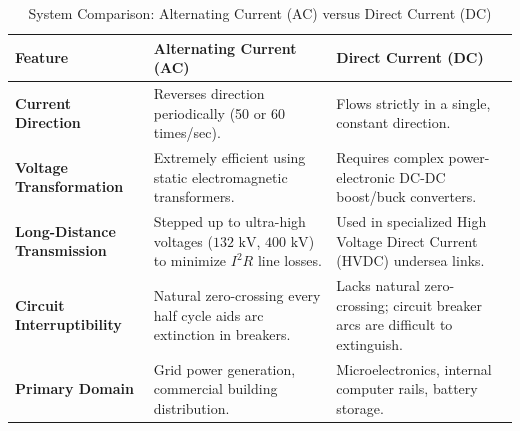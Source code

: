 \begin{table}[htbp]
\centering
\small
\caption{System Comparison: Alternating Current (AC) versus Direct Current (DC)}
\label{tab:ac_vs_dc}
\begin{tabularx}{\textwidth}{l X X}
\toprule
\textbf{Feature} & \textbf{Alternating Current (AC)} & \textbf{Direct Current (DC)} \\
\midrule
\textbf{Current Direction} & Reverses direction periodically (50 or 60 times/sec). & Flows strictly in a single, constant direction. \\
\textbf{Voltage Transformation} & Extremely efficient using static electromagnetic transformers. & Requires complex power-electronic DC-DC boost/buck converters. \\
\textbf{Long-Distance Transmission} & Stepped up to ultra-high voltages ($132\text{ kV}$, $400\text{ kV}$) to minimize $I^2R$ line losses. & Used in specialized High Voltage Direct Current (HVDC) undersea links. \\
\textbf{Circuit Interruptibility} & Natural zero-crossing every half cycle aids arc extinction in breakers. & Lacks natural zero-crossing; circuit breaker arcs are difficult to extinguish. \\
\textbf{Primary Domain} & Grid power generation, commercial building distribution. & Microelectronics, internal computer rails, battery storage. \\
\bottomrule
\end{tabularx}
\end{table}

